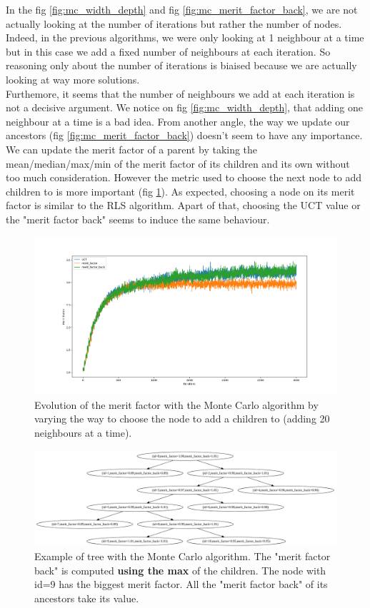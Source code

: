 \documentclass[a4paper,11pt,openany]{article}
\begin{document}
\noindent
In the fig \ref{fig:mc_width_depth} and fig \ref{fig:mc_merit_factor_back}, we are not actually looking at the number of iterations but rather the number of nodes. Indeed, in the previous algorithms, we were only looking at 1 neighbour at a time but in this case we add a fixed number of neighbours at each iteration. So reasoning only about the number of iterations is biaised because we are actually looking at way more solutions.\\
Furthemore, it seems that the number of neighbours we add at each iteration is not a decisive argument. We notice on fig \ref{fig:mc_width_depth}, that adding one neighbour at a time is a bad idea. From another angle, the way we update our ancestors (fig \ref{fig:mc_merit_factor_back}) doesn't seem to have any importance. We can update the merit factor of a parent by taking the mean/median/max/min of the merit factor of its children and its own without too much consideration. However the metric used to choose the next node to add children to is more important (fig \ref{fig:mc_choose_children}). As expected, choosing a node on its merit factor is similar to the RLS algorithm. Apart of that, choosing the UCT value or the "merit factor back" seems to induce the same behaviour.
\begin{figure}[H]
\begin{center}
\includegraphics[scale=0.22]{Images/mc_choose_children}
\caption{Evolution of the merit factor with the Monte Carlo algorithm by varying the way to choose the node to add a children to (adding 20 neighbours at a time).}
\label{fig:mc_choose_children}
\end{center}
\end{figure}
\begin{figure}[H]
\begin{center}
\includegraphics[scale=0.3]{Images/mc_tree}
\caption{Example of tree with the Monte Carlo algorithm. The "merit factor back" is computed \textbf{using the max} of the children. The node with id=9 has the biggest merit factor. All the "merit factor back" of its ancestors take its value.}
\label{fig:mc_tree}
\end{center}
\end{figure}
\end{document}
